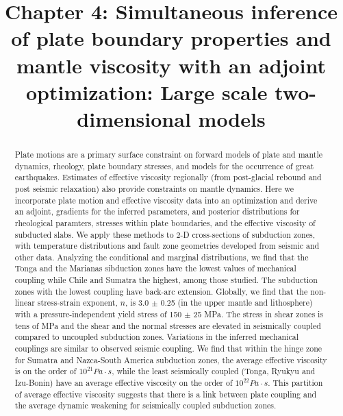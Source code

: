 \documentclass[12pt]{article}
\date{}
\title{Chapter 4: Simultaneous inference of plate boundary properties and mantle viscosity with an adjoint optimization: Large scale two-dimensional models}
\begin{document}
\maketitle
\begin{abstract}
 Plate motions are a primary surface constraint on forward models of plate and mantle dynamics, rheology, plate boundary stresses, and models for the occurrence of great earthquakes. Estimates of effective viscosity regionally (from post-glacial rebound and post seismic relaxation) also provide constraints on mantle dynamics. 
Here we incorporate plate motion and effective viscosity data into an optimization and derive an adjoint, gradients for the inferred parameters, and posterior distributions for  rheological paramters, stresses within plate boundaries, and the effective viscosity of subducted slabs. 
We apply these methods to 2-D cross-sections of subduction zones, with temperature distributions and fault zone geometries developed from seismic and other data. 
Analyzing the conditional and marginal distributions, we find that the 
Tonga and the Marianas sibduction zones have the lowest values of mechanical coupling while Chile and Sumatra the highest, among those studied. The subduction zones with the lowest coupling have back-arc extension. Globally, we find that the non-linear stress-strain exponent, $n$, is 3.0 $\pm$ 0.25 (in the upper mantle and lithosphere) with a pressure-independent yield stress of 150 $\pm$ 25 MPa. The stress in shear zones is tens of MPa and the shear and the normal stresses are elevated in seismically coupled compared to uncoupled subduction zones. 
Variations in the inferred mechanical couplings are similar to observed seismic coupling. 
We find that within the hinge zone for Sumatra and Nazca-South America subduction zones, the average effective viscosity is on the order of $10^{21} Pa\cdot s$, while the least seismically coupled (Tonga, Ryukyu and Izu-Bonin) have an average effective viscosity on the order of $10^{22} Pa\cdot s$. This partition of average effective viscosity suggests that there is a link between plate coupling and the average dynamic weakening for seismically coupled subduction zones.
\end{abstract} 
\end{document}
